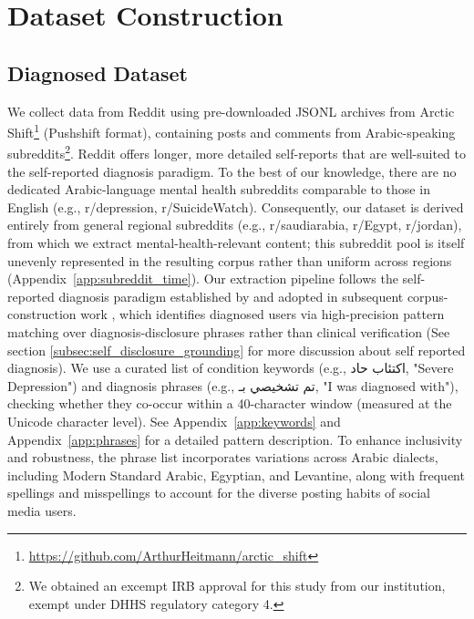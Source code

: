 \documentclass[11pt]{article}
\begin{document}
\section{Dataset Construction}
\label{subsec:data_source}

\subsection{Diagnosed Dataset}

We collect data from Reddit using pre-downloaded JSONL archives from Arctic Shift\footnote{\url{https://github.com/ArthurHeitmann/arctic_shift}} (Pushshift format), containing posts and comments from Arabic-speaking subreddits\footnote{We obtained an excempt IRB approval for this study from our institution, exempt under DHHS regulatory category 4. }. Reddit offers longer, more detailed self-reports that are well-suited to the self-reported diagnosis paradigm. To the best of our knowledge, there are no dedicated Arabic-language mental health subreddits comparable to those in English (e.g., r/depression, r/SuicideWatch). Consequently, our dataset is derived entirely from general regional subreddits (e.g., r/saudiarabia, r/Egypt, r/jordan), from which we extract mental-health-relevant content; this subreddit pool is itself unevenly represented in the resulting corpus rather than uniform across regions (Appendix~\ref{app:subreddit_time}).
Our extraction pipeline follows the self-reported diagnosis paradigm established by \citet{coppersmith2014quantifying} and adopted in subsequent corpus-construction work \citep{coppersmith2015clpsych, cohan-etal-2018-smhd}, which identifies diagnosed users via high-precision pattern matching over diagnosis-disclosure phrases rather than clinical verification (See section \ref{subsec:self_disclosure_grounding} for more discussion about self reported diagnosis).
We use a curated list of condition keywords (e.g., \foreignlanguage{arabic}{اكتئاب حاد}, "Severe Depression") and diagnosis phrases (e.g., \foreignlanguage{arabic}{تم تشخيصي بـ}, "I was diagnosed with"), checking whether they co-occur within a 40-character window (measured at the Unicode character level). See Appendix~\ref{app:keywords} and Appendix~\ref{app:phrases} for a detailed pattern description. To enhance inclusivity and robustness, the phrase list incorporates variations across Arabic dialects, including Modern Standard Arabic, Egyptian, and Levantine, along with frequent spellings and misspellings to account for the diverse posting habits of social media users. 
\end{document}
